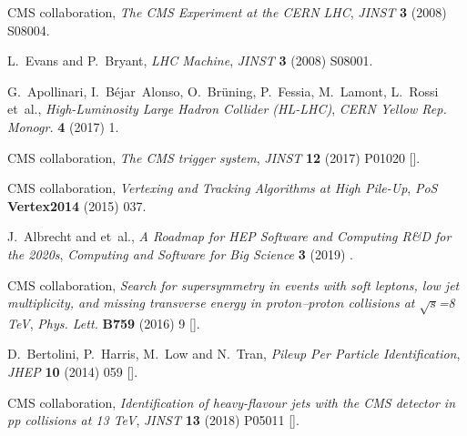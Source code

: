 \documentclass[a4paper,11pt]{article}
\begin{document}
\providecommand{\href}[2]{#2}\begingroup\raggedright\begin{thebibliography}{10}

{\scshape CMS} collaboration, \emph{{The CMS Experiment at the CERN LHC}},
  \href{https://doi.org/10.1088/1748-0221/3/08/S08004}{\emph{JINST} {\bfseries
  3} (2008) S08004}.

L.~Evans and P.~Bryant, \emph{{LHC Machine}},
  \href{https://doi.org/10.1088/1748-0221/3/08/S08001}{\emph{JINST} {\bfseries
  3} (2008) S08001}.

G.~Apollinari, I.~B\'{e}jar~Alonso, O.~Br{\"u}ning, P.~Fessia, M.~Lamont,
  L.~Rossi et~al., \emph{{High-Luminosity Large Hadron Collider (HL-LHC)}},
  \href{https://doi.org/10.23731/CYRM-2017-004}{\emph{CERN Yellow Rep. Monogr.}
  {\bfseries 4} (2017) 1}.

{\scshape CMS} collaboration, \emph{{The CMS trigger system}},
  \href{https://doi.org/10.1088/1748-0221/12/01/P01020}{\emph{JINST} {\bfseries
  12} (2017) P01020} [\href{https://arxiv.org/abs/1609.02366}{{}}].

{\scshape CMS} collaboration, \emph{{Vertexing and Tracking Algorithms at High
  Pile-Up}}, \href{https://doi.org/10.22323/1.227.0037}{\emph{PoS} {\bfseries
  Vertex2014} (2015) 037}.

J.~Albrecht and et~al., \emph{{A Roadmap for HEP Software and Computing R\&D
  for the 2020s}},
  \href{https://doi.org/10.1007/s41781-018-0018-8}{\emph{Computing and Software
  for Big Science} {\bfseries 3} (2019) }.
  
{\scshape CMS} collaboration, \emph{{Search for supersymmetry in events with
  soft leptons, low jet multiplicity, and missing transverse energy in
  proton–proton collisions at $\sqrt{s}$=8 TeV}},
  \href{https://doi.org/10.1016/j.physletb.2016.05.033}{\emph{Phys. Lett.}
  {\bfseries B759} (2016) 9}
  [\href{https://arxiv.org/abs/1512.08002}{{}}].

D.~Bertolini, P.~Harris, M.~Low and N.~Tran, \emph{{Pileup Per Particle
  Identification}}, \href{https://doi.org/10.1007/JHEP10(2014)059}{\emph{JHEP}
  {\bfseries 10} (2014) 059} [\href{https://arxiv.org/abs/1407.6013}{{}}].

{\scshape CMS} collaboration, \emph{{Identification of heavy-flavour jets with
  the CMS detector in pp collisions at 13 TeV}},
  \href{https://doi.org/10.1088/1748-0221/13/05/P05011}{\emph{JINST} {\bfseries
  13} (2018) P05011} [\href{https://arxiv.org/abs/1712.07158}{{}}].
  

\end{thebibliography}
\end{document}
